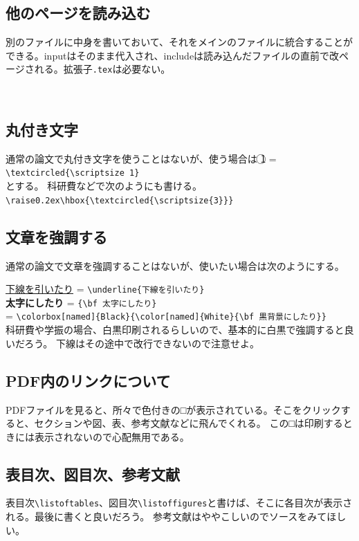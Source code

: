 \documentclass[a4j]{jsarticle}
\begin{document}
\subsection{他のページを読み込む}
別のファイルに中身を書いておいて、それをメインのファイルに統合することができる。inputはそのまま代入され、includeは読み込んだファイルの直前で改ページされる。拡張子\verb|.tex|は必要ない。
\begin{verbatim}


\end{verbatim}

\subsection{丸付き文字}
通常の論文で丸付き文字を使うことはないが、使う場合は
\textcircled{\scriptsize 1} = \verb|\textcircled{\scriptsize 1}|\\ とする。
科研費などで次のようにも書ける。\verb|\raise0.2ex\hbox{\textcircled{\scriptsize{3}}}|

\subsection{文章を強調する}
通常の論文で文章を強調することはないが、使いたい場合は次のようにする。

\noindent
\underline{下線を引いたり} = \verb|\underline{下線を引いたり}|\\
{\bf 太字にしたり} = \verb|{\bf 太字にしたり}|\\
\colorbox[named]{Black}{\color[named]{White}{\bf 黒背景にしたり}} = \verb|\colorbox[named]{Black}{\color[named]{White}{\bf 黒背景にしたり}}|\\
科研費や学振の場合、白黒印刷されるらしいので、基本的に白黒で強調すると良いだろう。 下線はその途中で改行できないので注意せよ。

\subsection{PDF内のリンクについて}
PDFファイルを見ると、所々で色付きの□が表示されている。そこをクリックすると、セクションや図、表、参考文献などに飛んでくれる。
この□は印刷するときには表示されないので心配無用である。

\subsection{表目次、図目次、参考文献}
表目次\verb|\listoftables|、図目次\verb|\listoffigures|と書けば、そこに各目次が表示される。最後に書くと良いだろう。
参考文献はややこしいのでソースをみてほしい。
\listoftables %
\listoffigures %
\end{document}
